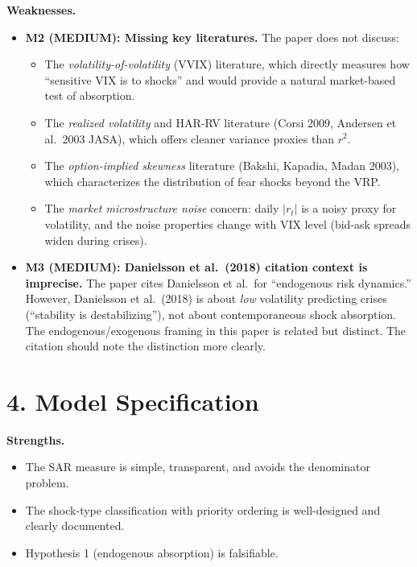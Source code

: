 \documentclass[12pt,a4paper]{article}
\begin{document}
\textbf{Weaknesses.}
\begin{itemize}[nosep]
  \item \textcolor{warncolor}{\textbf{M2 (MEDIUM): Missing key literatures.}}  The paper does not discuss:
  \begin{itemize}[nosep]
    \item The \emph{volatility-of-volatility} (VVIX) literature, which directly measures how ``sensitive VIX is to shocks'' and would provide a natural market-based test of absorption.
    \item The \emph{realized volatility} and HAR-RV literature (Corsi 2009, Andersen et al.\ 2003 JASA), which offers cleaner variance proxies than $r^2$.
    \item The \emph{option-implied skewness} literature (Bakshi, Kapadia, Madan 2003), which characterizes the distribution of fear shocks beyond the VRP.
    \item The \emph{market microstructure noise} concern: daily $|r_t|$ is a noisy proxy for volatility, and the noise properties change with VIX level (bid-ask spreads widen during crises).
  \end{itemize}
  \item \textcolor{warncolor}{\textbf{M3 (MEDIUM): Danielsson et al.\ (2018) citation context is imprecise.}}  The paper cites Danielsson et al.\ for ``endogenous risk dynamics.''  However, Danielsson et al.\ (2018) is about \emph{low} volatility predicting crises (``stability is destabilizing''), not about contemporaneous shock absorption.  The endogenous/exogenous framing in this paper is related but distinct.  The citation should note the distinction more clearly.
\end{itemize}

\section*{4. Model Specification}

\textbf{Strengths.}
\begin{itemize}[nosep]
  \item The SAR measure is simple, transparent, and avoids the denominator problem.
  \item The shock-type classification with priority ordering is well-designed and clearly documented.
  \item Hypothesis 1 (endogenous absorption) is falsifiable.
\end{itemize}
\end{document}
